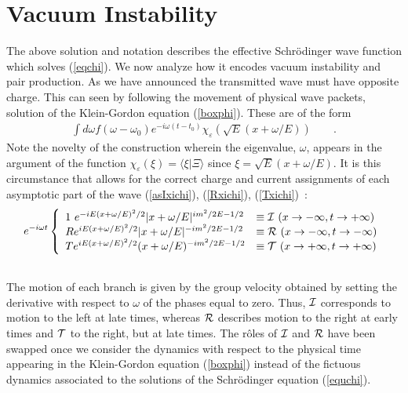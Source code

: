 \documentclass[12pt,oneside]{report}
\begin{document}
\section{Vacuum Instability}\label{vacuum}
\par The above solution and notation describes the effective Schr\"odinger
wave function which solves
(\ref{eqchi}). We now analyze how it encodes vacuum instability and pair production.
 As we have announced the transmitted wave must
have opposite charge.  This can seen
by following the movement of physical wave packets, solution of the Klein-Gordon
equation (\ref{boxphi}).  These are of the form
\begin{eqnarray}
\int d\omega f(\omega - \omega_0) e^{-i \omega(t-t_0)}
\chi_{\varepsilon}(\sqrt{E}(x+\omega/E)) \qquad .\label{wavepakt}
\end{eqnarray}
Note the novelty of the construction  wherein the eigenvalue,
$\omega$, appears in the argument of the function $\chi_{\varepsilon}(\xi)
= \langle \xi | \Xi \rangle$ 
since $\xi = \sqrt E \left(x + \omega/E \right)$.  It is this
circumstance that allows for the correct charge and current
assignments of each  asymptotic part of the 
wave (\ref{asIxichi}), (\ref{Rxichi}),
(\ref{Txichi})~:
\begin{eqnarray}
e^{-i \omega t} \left\{ \begin{array}{ll}
1\ e^{-iE(x + \omega/E)^2/2}|x + \omega/E|^{im^2/2E-1/2} &\equiv {\cal I}\
(x\to -\infty ,t\to +\infty) \\
R e^{iE(x+\omega/E)^2/2}|x + \omega/E|^{-im^2/2E-1/2} &\equiv {\cal R}\
(x\to -\infty ,t\to -\infty)\\
T e^{iE(x+\omega/E)^2/2} (x + \omega/E)^{-im^2/2E-1/2}&\equiv {\cal T} \
(x\to +\infty ,t\to +\infty)
\end{array} \right.\\ \nonumber
\strut\label{asymptwave}
\end{eqnarray}
The motion of each branch is given by the group velocity
obtained by setting the derivative with respect to $\omega$ of the phases
equal to zero.  Thus, ${\cal I}$ corresponds to motion to the left 
at late times, 
whereas ${\cal R}$ describes motion 
 to the right at early times and
${\cal T}$ to the right, but at late times.  The r\^ oles of ${\cal I}$ and ${\cal R}$ have been
swapped once we consider the dynamics with respect to the physical time appearing in the 
Klein-Gordon equation (\ref{boxphi}) instead of the fictuous dynamics associated
to the solutions of the Schr\"odinger equation (\ref{equchi}).
\end{document}
